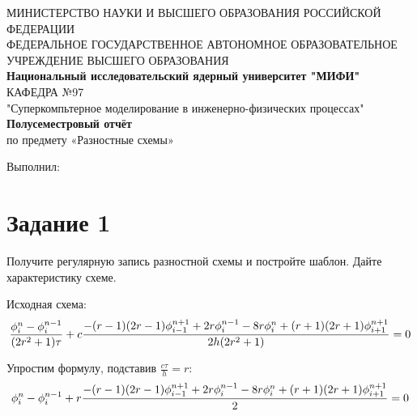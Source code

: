 \documentclass[a4paper, 14pt]{extreport}
\begin{document}
\begin{titlepage}
	\begin{center}
		\small{МИНИСТЕРСТВО НАУКИ И ВЫСШЕГО ОБРАЗОВАНИЯ РОССИЙСКОЙ ФЕДЕРАЦИИ\\
		ФЕДЕРАЛЬНОЕ ГОСУДАРСТВЕННОЕ АВТОНОМНОЕ ОБРАЗОВАТЕЛЬНОЕ УЧРЕЖДЕНИЕ ВЫСШЕГО ОБРАЗОВАНИЯ\\}
		\normalsize\textbf{Национальный исследовательский ядерный университет "МИФИ"\\}
		\vspace{10 mm}
		{КАФЕДРА №97\\
    		"Суперкомпьтерное моделирование в инженерно-физических процессах"\\}
		\vspace{70 mm}
		\Large\textbf{Полусеместровый отчёт}\\
    		{по предмету «Разностные схемы»\\}
		\vspace{50 mm}
		\hspace{300pt}\raggedright\normalsize{Выполнил:\\}
		\hspace{300pt}{студент группы Б21-221\\}
		\hspace{300pt}{Чурсин Алексей Владимирович\\}
		\vspace{47 mm}
	\end{center}
\end{titlepage}
\setcounter{page}{2}

\newpage
\tableofcontents

\newpage 
\section*{Задание 1}
\normalsize 
Получите регулярную запись разностной схемы и постройте шаблон. Дайте характеристику схеме.
\par Исходная схема:
\begin{equation}
	\label{start_schema}
	\small\frac{\phi_i^n-\phi_i^{n-1}}{(2r^2+1)\tau}+c\frac{-(r-1)(2r-1)\phi_{i-1}^{n+1}+2r\phi_i^{n-1}-8r\phi_i^n+(r+1)(2r+1)\phi_{i+1}			^{n+1}}{2h(2r^2+1)}=0
\end{equation}

Упростим формулу, подставив $\frac{c\tau}{h} = r$:
\begin{equation}
	\label{simplyfied_schema}
	\small\phi_i^n-\phi_i^{n-1}+r\frac{-(r-1)(2r-1)\phi_{i-1}^{n+1}+2r\phi_i^{n-1}-8r\phi_i^n+(r+1)(2r+1)\phi_{i+1}						^{n+1}}{2}=0
\end{equation}
\end{document}
